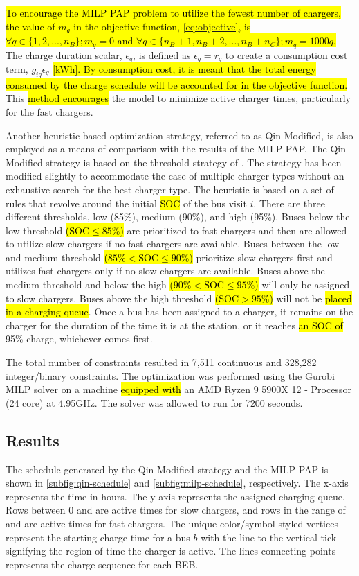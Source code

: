 \documentclass[utf8]{FrontiersinHarvard}
\let\cite\citep                                       %
\newcommand{\fast}{15 }                                                         %
\newcommand{\slow}{15 }                                                         %
\newcommand{\contvars}{7,511 }
\newcommand{\intvars}{328,282 }
\newcommand{\timeran}{7200 }                                                    %
\begin{document}
\hl{To encourage the MILP PAP problem to utilize the fewest number of chargers, the value of $m_q$ in the objective function, {\autoref{eq:objective}}, is $\forall q \in \{1,2,..., n_B \}; m_q = 0$ and $\forall q \in \{n_B + 1, n_B + 2,..., n_B + n_C \}; m_q = 1000q$.} The charge duration scalar, \(\epsilon_q\), is defined as \(\epsilon_q = r_q\) to create a consumption cost
term, \(g_{iq}\epsilon_q\) \hl{[kWh]. By consumption cost, it is meant that the total energy consumed by the charge schedule will be accounted for in the objective function.} This \hl{method encourages} the model to minimize
active charger times, particularly for the fast chargers.

Another heuristic-based optimization strategy, referred to as Qin-Modified, is also employed as a means of comparison
with the results of the MILP PAP. The Qin-Modified strategy is based on the threshold strategy of
\cite{qin-2016-numer-analy}. The strategy has been modified slightly to accommodate the case of multiple charger types
without an exhaustive search for the best charger type. The heuristic is based on a set of rules that revolve around the
initial \hl{SOC} of the bus visit \(i\). There are three different thresholds, low (85\%),
medium (90\%), and high (95\%). Buses below the low threshold \hl{($\text{SOC} \le 85\%$)} are prioritized to
fast chargers and then are allowed to utilize slow chargers if no fast chargers are available. Buses between the low and
medium threshold \hl{($85\% < \text{SOC} \le 90\%$)} prioritize slow chargers first and utilizes fast chargers
only if no slow chargers are available. Buses above the medium threshold and below the high \hl{($90\% < \text{SOC} \le 95\%$)} will only be assigned to slow chargers. Buses above the high threshold \hl{($\text{SOC} > 95\%$)} will not be \hl{placed in a charging queue}. Once a bus has been assigned to a charger, it remains
on the charger for the duration of the time it is at the station, or it reaches \hl{an SOC of} 95\% charge,
whichever comes first.

The total number of constraints resulted in \contvars continuous and \intvars integer/binary constraints. The
optimization was performed using the Gurobi MILP solver \cite{gurobi-2021-gurob-optim} on a machine
\hl{equipped with} an AMD Ryzen 9 5900X 12 - Processor (24 core) at 4.95GHz. The solver was allowed to run
for \timeran seconds.

\subsection{Results}
\label{results}
The schedule generated by the Qin-Modified strategy and the MILP PAP is shown in \autoref{subfig:qin-schedule} and
\autoref{subfig:milp-schedule}, respectively. The x-axis represents the time in hours. The y-axis represents the
assigned charging queue. Rows between 0 and \fpeval{\slow - 1} are active times for slow chargers, and rows in the range
of \fpeval{\slow - 1} and \fpeval{\fast + \slow - 1} are active times for fast chargers. The unique color/symbol-styled
vertices represent the starting charge time for a bus \(b\) with the line to the vertical tick signifying the region of
time the charger is active. The lines connecting points represents the charge sequence for each BEB.
\end{document}
